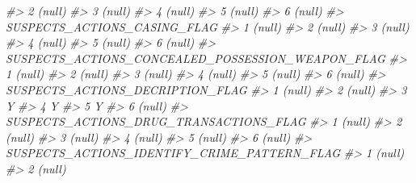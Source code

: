 \documentclass[
]{krantz}
\makeatletter
\newenvironment{Shaded}{\begin{snugshade}}{\end{snugshade}}
\newcommand{\CommentTok}[1]{\textcolor[rgb]{0.37,0.37,0.37}{\textit{#1}}}
\newenvironment{kframe}{%
\medskip{}
\setlength{\fboxsep}{.8em}
 \def\at@end@of@kframe{}%
 \ifinner\ifhmode%
  \def\at@end@of@kframe{\end{minipage}}%
  \begin{minipage}{\columnwidth}%
 \fi\fi%
 \def\FrameCommand##1{\hskip\@totalleftmargin \hskip-\fboxsep
 \colorbox{shadecolor}{##1}\hskip-\fboxsep
     \hskip-\linewidth \hskip-\@totalleftmargin \hskip\columnwidth}%
 \MakeFramed {\advance\hsize-\width
   \@totalleftmargin\z@ \linewidth\hsize
   \@setminipage}}%
 {\par\unskip\endMakeFramed%
 \at@end@of@kframe}
\renewenvironment{Shaded}{\begin{kframe}}{\end{kframe}}
\makeatother
\begin{document}
\begin{Shaded}
\begin{Highlighting}[]
\CommentTok{\#\textgreater{} 2                                                     (null)}
\CommentTok{\#\textgreater{} 3                                                     (null)}
\CommentTok{\#\textgreater{} 4                                                     (null)}
\CommentTok{\#\textgreater{} 5                                                     (null)}
\CommentTok{\#\textgreater{} 6                                                     (null)}
\CommentTok{\#\textgreater{}   SUSPECTS\_ACTIONS\_CASING\_FLAG}
\CommentTok{\#\textgreater{} 1                       (null)}
\CommentTok{\#\textgreater{} 2                       (null)}
\CommentTok{\#\textgreater{} 3                       (null)}
\CommentTok{\#\textgreater{} 4                       (null)}
\CommentTok{\#\textgreater{} 5                       (null)}
\CommentTok{\#\textgreater{} 6                       (null)}
\CommentTok{\#\textgreater{}   SUSPECTS\_ACTIONS\_CONCEALED\_POSSESSION\_WEAPON\_FLAG}
\CommentTok{\#\textgreater{} 1                                            (null)}
\CommentTok{\#\textgreater{} 2                                            (null)}
\CommentTok{\#\textgreater{} 3                                            (null)}
\CommentTok{\#\textgreater{} 4                                            (null)}
\CommentTok{\#\textgreater{} 5                                            (null)}
\CommentTok{\#\textgreater{} 6                                            (null)}
\CommentTok{\#\textgreater{}   SUSPECTS\_ACTIONS\_DECRIPTION\_FLAG}
\CommentTok{\#\textgreater{} 1                           (null)}
\CommentTok{\#\textgreater{} 2                           (null)}
\CommentTok{\#\textgreater{} 3                                Y}
\CommentTok{\#\textgreater{} 4                                Y}
\CommentTok{\#\textgreater{} 5                                Y}
\CommentTok{\#\textgreater{} 6                           (null)}
\CommentTok{\#\textgreater{}   SUSPECTS\_ACTIONS\_DRUG\_TRANSACTIONS\_FLAG}
\CommentTok{\#\textgreater{} 1                                  (null)}
\CommentTok{\#\textgreater{} 2                                  (null)}
\CommentTok{\#\textgreater{} 3                                  (null)}
\CommentTok{\#\textgreater{} 4                                  (null)}
\CommentTok{\#\textgreater{} 5                                  (null)}
\CommentTok{\#\textgreater{} 6                                  (null)}
\CommentTok{\#\textgreater{}   SUSPECTS\_ACTIONS\_IDENTIFY\_CRIME\_PATTERN\_FLAG}
\CommentTok{\#\textgreater{} 1                                       (null)}
\CommentTok{\#\textgreater{} 2                                       (null)}

\end{Highlighting}
\end{Shaded}
\end{document}
